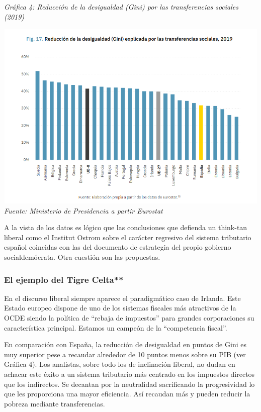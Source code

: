 \documentclass[
]{article}
\begin{document}
\emph{Gráfica 4: Reducción de la desigualdad (Gini) por las
transferencias sociales (2019)}

\includegraphics[width=5.92153in,height=3.62361in]{png/image3.png}
\emph{Fuente: Ministerio de Presidencia a partir Eurostat}

A la vista de los datos es lógico que las conclusiones que defienda un
think-tan liberal como el Institut Ostrom sobre el carácter regresivo
del sistema tributario español coincidas con las del documento de
estrategia del propio gobierno socialdemócrata. Otra cuestión son las
propuestas.

\hypertarget{el-ejemplo-del-tigre-celta}{%
\subsubsection*{El ejemplo del Tigre
Celta**}\label{el-ejemplo-del-tigre-celta}}

En el discurso liberal siempre aparece el paradigmático caso de Irlanda.
Este Estado europeo dispone de uno de los sistemas fiscales más
atractivos de la OCDE siendo la política de ``rebaja de impuestos'' para
grandes corporaciones su característica principal. Estamos un campeón de
la ``competencia fiscal''.

En comparación con España, la reducción de desigualdad en puntos de Gini
es muy superior pese a recaudar alrededor de 10 puntos menos sobre su
PIB (ver Gráfica 4). Los analistas, sobre todo los de inclinación
liberal, no dudan en achacar este éxito a un sistema tributario más
centrado en los impuestos directos que los indirectos. Se decantan por
la neutralidad sacrificando la progresividad lo que les proporciona una
mayor eficiencia. Así recaudan más y pueden reducir la pobreza mediante
transferencias.
\end{document}
